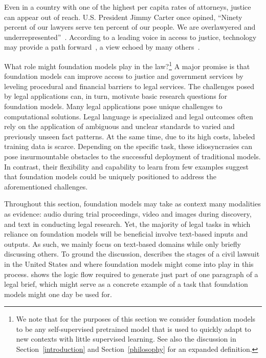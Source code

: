Even in a country with one of the highest per capita rates of attorneys, justice can appear out of reach. U.S. President Jimmy Carter once opined, ``Ninety percent of our lawyers serve ten percent of our people. We are overlawyered and underrepresented''~\citep{carter1978speech}. According to a leading voice in access to justice, technology may provide a path forward~\citep{rhode2014access}, a view echoed by many  others~\citep{cabral2012using}.

What role might foundation models play in the law?\footnote{We note that for the purposes of this section we consider foundation models to be any self-supervised pretrained model that is used to quickly adapt to new contexts with little supervised learning. See also the discussion in Section~\ref{introduction} and Section~\ref{philosophy} for an expanded definition.} A major promise is that foundation models can improve access to justice and government services by leveling procedural and financial barriers to legal services. The challenges posed by legal applications can, in turn, motivate basic research questions for foundation models. Many legal applications pose unique challenges to computational solutions. Legal language is specialized and legal outcomes often rely on the application of ambiguous and unclear standards to varied and previously unseen fact patterns. At the same time, due to its high costs, labeled training data is scarce. Depending on the specific task, these idiosyncrasies can pose insurmountable obstacles to the successful deployment of traditional models. In contrast, their flexibility and capability to learn from few examples suggest that foundation models could be uniquely positioned to address the aforementioned challenges.

Throughout this section, foundation models may take as context many modalities as evidence: audio during trial proceedings, video and images during discovery, and text in conducting legal research. Yet, the majority of legal tasks in which reliance on foundation models will be beneficial involve text-based inputs and outputs. As such, we mainly focus on text-based domains while only briefly discussing others. To ground the discussion,  describes the stages of a civil lawsuit in the United States and where foundation models might come into play in this process.  shows the logic flow required to generate just part of one paragraph of a legal brief, which might serve as a concrete example of a task that foundation models might one day be used for.

